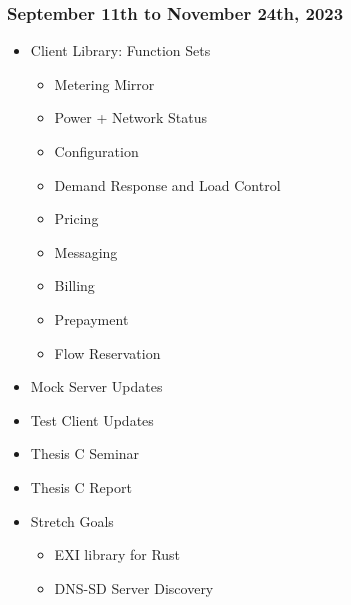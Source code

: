 \subsubsection{September 11th to November 24th, 2023}
\begin{itemize}
    \item Client Library: Function Sets
    \begin{itemize}
        \item Metering Mirror
        \item Power + Network Status
        \item Configuration
        \item Demand Response and Load Control
        \item Pricing
        \item Messaging
        \item Billing
        \item Prepayment
        \item Flow Reservation
    \end{itemize}
    \item Mock Server Updates
    \item Test Client Updates
    \item Thesis C Seminar
    \item Thesis C Report
    \item Stretch Goals
    \begin{itemize}
        \item EXI library for Rust
        \item DNS-SD Server Discovery
    \end{itemize}
\end{itemize}

